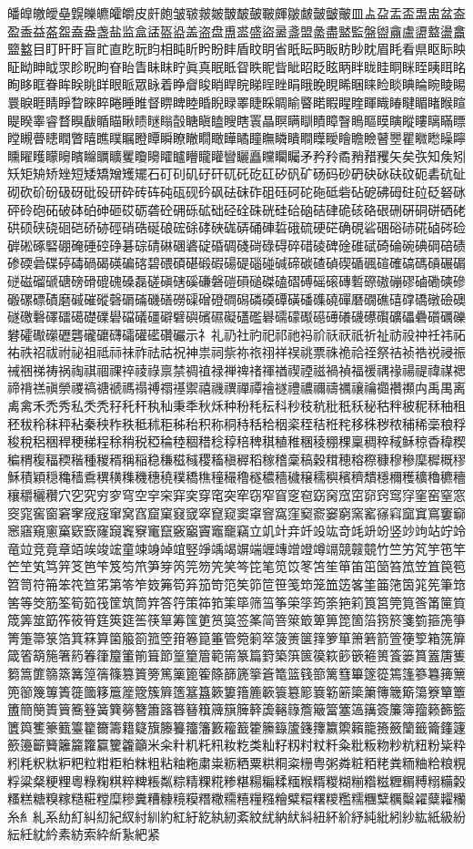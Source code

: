 皤皥皦皧皨皩皪皫皬皭皮皯皰皱皲皳皴皵皶皷皸皹皺皻皼皽皾皿盀盁盂盃盄盅盆盇盈盉益盋盌盍盎盏盐监盒盓盔盕盖盗盘盙盚盛盜盝盞盟盠盡盢監盤盥盦盧盨盩盪盫盬盭目盯盰盱盲盳直盵盶盷相盹盺盻盼盽盾盿眀省眂眃眄眅眆眇眈眉眊看県眍眎眏眐眑眒眓眔眕眖眗眘眙眚眛眜眝眞真眠眡眢眣眤眥眦眧眨眩眪眫眬眭眮眯眰眱眲眳眴眵眶眷眸眹眺眻眼眽眾眿着睁睂睃睄睅睆睇睈睉睊睋睌睍睎睏睐睑睒睓睔睕睖睗睘睙睚睛睜睝睞睟睠睡睢督睤睥睦睧睨睩睪睫睬睭睮睯睰睱睲睳睴睵睶睷睸睹睺睻睼睽睾睿瞀瞁瞂瞃瞄瞅瞆瞇瞈瞉瞊瞋瞌瞍瞎瞏瞐瞑瞒瞓瞔瞕瞖瞗瞘瞙瞚瞛瞜瞝瞞瞟瞠瞡瞢瞣瞤瞥瞦瞧瞨瞩瞪瞫瞬瞭瞮瞯瞰瞱瞲瞳瞴瞵瞶瞷瞸瞹瞺瞻瞼瞽瞾瞿矀矁矂矃矄矅矆矇矈矉矊矋矌矍矎矏矐矑矒矓矔矕矖矗矘矙矚矛矜矝矞矟矠矡矢矣矤知矦矧矨矩矪矫矬短矮矯矰矱矲石矴矵矶矷矸矹矺矻矼矽矾矿砀码砂砃砄砅砆砇砈砉砊砋砌砍砎砏砐砑砒砓研砕砖砗砘砙砚砛砜砝砞砟砠砡砢砣砤砥砦砧砨砩砪砫砬砭砮砯砰砱砲砳破砵砶砷砸砹砺砻砼砽砾砿础硁硂硃硄硅硆硇硈硉硊硋硌硍硎硏硐硑硒硓硔硕硖硗硘硙硚硛硜硝硞硟硠硡硢硣硤硥硦硧硨硩硪硫硬硭确硯硰硱硲硳硴硵硶硷硸硹硺硻硼硽硾硿碀碁碂碃碄碅碆碇碈碉碊碋碌碍碎碏碐碑碒碓碔碕碖碗碘碙碚碛碜碝碞碟碠碡碢碣碤碥碦碧碨碩碪碫碬碭碮碯碰碱碲碳碴碵碶碷碸碹確碻碼碽碾碿磀磁磂磃磄磅磆磇磈磉磊磋磌磍磎磏磐磑磒磓磔磕磖磗磘磙磚磛磜磝磞磟磠磡磢磣磤磥磦磧磨磩磪磫磬磭磮磯磰磱磲磳磴磵磶磷磸磹磺磻磼磽磾磿礀礁礂礃礄礅礆礇礈礉礊礋礌礍礎礏礐礑礒礓礔礕礖礗礘礙礚礛礜礝礞礟礠礡礢礣礤礥礦礧礨礩礪礫礬礭礮礯礰礱礲礳礴礵礶礷礸礹示礻礼礽社礿祀祁祂祃祄祅祆祇祈祉祊祋祌祍祎祏祐祑祒祓祔祕祖祗祘祙祚祛祜祝神祟祠祡祢祣祤祥祦祧票祩祪祫祬祭祮祯祰祱祲祳祴祵祶祷祸祹祺祻祼祽祾祿禀禁禂禃禄禅禆禇禈禉禊禋禌禍禎福禐禑禒禓禔禕禖禗禘禙禚禛禜禝禞禟禠禡禢禣禤禥禦禧禨禩禪禫禬禭禮禯禰禱禲禳禴禵禶禷禸禹禺离禼禽禾禿秀私秂秃秄秅秆秇秈秉秊秋秌种秎秏秐科秒秓秔秕秖秗秘秙秚秛秜秝秞租秠秡秢秣秤秥秦秧秨秩秪秫秬秭秮积称秱秲秳秴秵秶秷秸秹秺移秼秽秾秿稀稁稂稃稄稅稆稇稈稉稊程稌稍税稏稐稑稒稓稔稕稖稗稘稙稚稛稜稝稞稟稠稡稢稣稤稥稦稧稨稩稪稫稬稭種稯稰稱稲稳稴稵稶稷稸稹稺稻稼稽稾稿穀穁穂穃穄穅穆穇穈穉穊穋穌積穎穏穐穑穒穓穔穕穖穗穘穙穚穛穜穝穞穟穠穡穢穣穤穥穦穧穨穩穪穫穬穭穮穯穰穱穲穳穴穵究穷穸穹空穻穼穽穾穿窀突窂窃窄窅窆窇窈窉窊窋窌窍窎窏窐窑窒窓窔窕窖窗窘窙窚窛窜窝窞窟窠窡窢窣窤窥窦窧窨窩窪窫窬窭窮窯窰窱窲窳窴窵窶窷窸窹窺窻窼窽窾窿竀竁竂竃竄竅竆竇竈竉竊立竌竍竎竏竐竑竒竓竔竕竖竗竘站竚竛竜竝竞竟章竡竢竣竤童竦竧竨竩竪竫竬竭竮端竰竱竲竳竴竵競竷竸竹竺竻竼竽竾竿笀笁笂笃笄笅笆笇笈笉笊笋笌笍笎笏笐笑笒笓笔笕笖笗笘笙笚笛笜笝笞笟笠笡笢笣笤笥符笧笨笩笪笫第笭笮笯笰笱笲笳笴笵笶笷笸笹笺笻笼笽笾笿筀筁筂筃筄筅筆筇筈等筊筋筌筍筎筏筐筑筒筓答筕策筗筘筙筚筛筜筝筞筟筠筡筢筣筤筥筦筧筨筩筪筫筬筭筮筯筰筱筲筳筴筵筶筷筸筹筺筻筼筽签筿简箁箂箃箄箅箆箇箈箉箊箋箌箍箎箏箐箑箒箓箔箕箖算箘箙箚箛箜箝箞箟箠管箢箣箤箥箦箧箨箩箪箫箬箭箮箯箰箱箲箳箴箵箶箷箸箹箺箻箼箽箾箿節篁篂篃範篅篆篇篈築篊篋篌篍篎篏篐篑篒篓篔篕篖篗篘篙篚篛篜篝篞篟篠篡篢篣篤篥篦篧篨篩篪篫篬篭篮篯篰篱篲篳篴篵篶篷篸篹篺篻篼篽篾篿簀簁簂簃簄簅簆簇簈簉簊簋簌簍簎簏簐簑簒簓簔簕簖簗簘簙簚簛簜簝簞簟簠簡簢簣簤簥簦簧簨簩簪簫簬簭簮簯簰簱簲簳簴簵簶簷簸簹簺簻簼簽簾簿籀籁籂籃籄籅籆籇籈籉籊籋籌籍籎籏籐籑籒籓籔籕籖籗籘籙籚籛籜籝籞籟籠籡籢籣籤籥籦籧籨籩籪籫籬籭籮籯籰籱籲米籴籵籶籷籸籹籺类籼籽籾籿粀粁粂粃粄粅粆粇粈粉粊粋粌粍粎粏粐粑粒粓粔粕粖粗粘粙粚粛粜粝粞粟粠粡粢粣粤粥粦粧粨粩粪粫粬粭粮粯粰粱粲粳粴粵粶粷粸粹粺粻粼粽精粿糀糁糂糃糄糅糆糇糈糉糊糋糌糍糎糏糐糑糒糓糔糕糖糗糘糙糚糛糜糝糞糟糠糡糢糣糤糥糦糧糨糩糪糫糬糭糮糯糰糱糲糳糴糵糶糷糸糹糺系糼糽糾糿紀紁紂紃約紅紆紇紈紉紊紋紌納紎紏紐紑紒紓純紕紖紗紘紙級紛紜紝紞紟素紡索紣紤紥紦紧